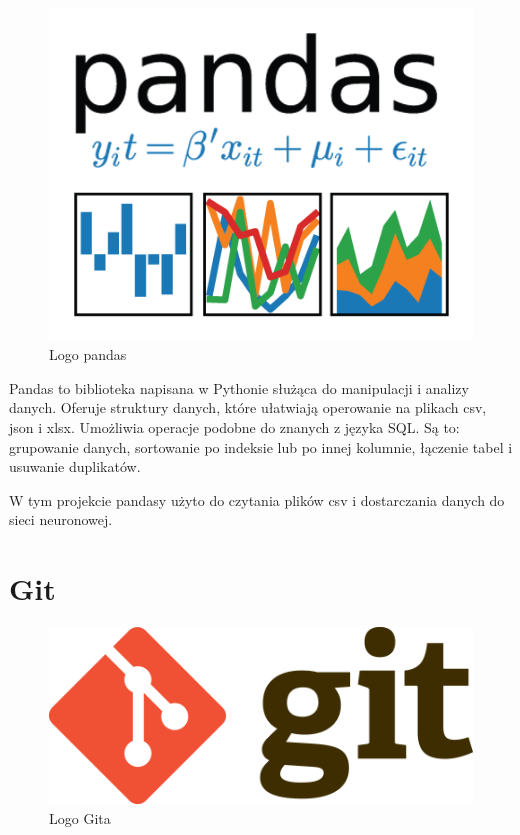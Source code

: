     \begin{figure}[htp]
        \centering
        \includegraphics[scale=0.4]{./img/pandas-logo.png}
        \caption{Logo pandas}
    \end{figure}

    Pandas to biblioteka napisana w Pythonie służąca do manipulacji i analizy danych.
    Oferuje struktury danych, które ułatwiają operowanie na plikach csv, json i xlsx.
    Umożliwia operacje podobne do znanych z języka SQL.
    Są to: grupowanie danych, sortowanie po indeksie lub po innej kolumnie, łączenie tabel i usuwanie duplikatów.

    W tym projekcie pandasy użyto do czytania plików csv i dostarczania danych do sieci neuronowej.

    \section{Git}\label{sec:git}

    \begin{figure}[htp]
        \centering
        \includegraphics[scale=0.3]{./img/git-logo.png}
        \caption{Logo Gita}
    \end{figure}

